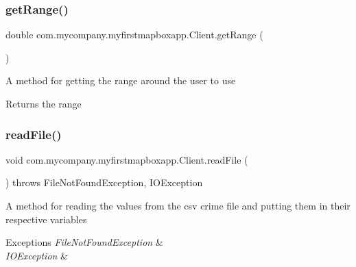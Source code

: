 \subsubsection{\texorpdfstring{get\+Range()}{getRange()}}
{\footnotesize\ttfamily double com.\+mycompany.\+myfirstmapboxapp.\+Client.\+get\+Range (\begin{DoxyParamCaption}{ }\end{DoxyParamCaption})\hspace{0.3cm}{\ttfamily [inline]}}

A method for getting the range around the user to use \begin{DoxyReturn}{Returns}
the range 
\end{DoxyReturn}
\mbox{\label{classcom_1_1mycompany_1_1myfirstmapboxapp_1_1_client_a78099d36b3c4131263265bb729846944}} 
\subsubsection{\texorpdfstring{read\+File()}{readFile()}}
{\footnotesize\ttfamily void com.\+mycompany.\+myfirstmapboxapp.\+Client.\+read\+File (\begin{DoxyParamCaption}{ }\end{DoxyParamCaption}) throws File\+Not\+Found\+Exception, I\+O\+Exception\hspace{0.3cm}{\ttfamily [inline]}}

A method for reading the values from the csv crime file and putting them in their respective variables 
\begin{DoxyExceptions}{Exceptions}
{\em File\+Not\+Found\+Exception} & \\
\hline
{\em I\+O\+Exception} & \\
\hline
\end{DoxyExceptions}
\mbox{\label{classcom_1_1mycompany_1_1myfirstmapboxapp_1_1_client_ac7bf8679bc329dce49f1afce43531ea0}} 
